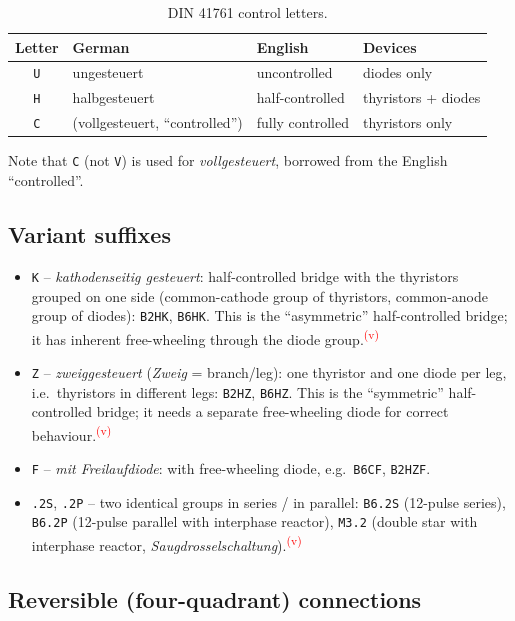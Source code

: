 \documentclass[11pt,a4paper]{article}
\newcommand{\code}[1]{\texttt{#1}}
\newcommand{\verify}{\textsuperscript{\textcolor{red}{(v)}}}
\begin{document}
\begin{table}[htb]
\centering
\caption{DIN 41761 control letters.}
\begin{tabular}{clll}
\toprule
Letter & German & English & Devices \\
\midrule
\code{U} & ungesteuert & uncontrolled & diodes only \\
\code{H} & halbgesteuert & half-controlled & thyristors + diodes \\
\code{C} & (vollgesteuert, ``controlled'') & fully controlled & thyristors only \\
\bottomrule
\end{tabular}
\end{table}

Note that \code{C} (not \code{V}) is used for \emph{vollgesteuert}, borrowed from the English ``controlled''.

\subsection{Variant suffixes}

\begin{itemize}
\item \code{K} -- \emph{kathodenseitig gesteuert}: half-controlled bridge with the thyristors grouped on one side (common-cathode group of thyristors, common-anode group of diodes): \code{B2HK}, \code{B6HK}. This is the ``asymmetric'' half-controlled bridge; it has inherent free-wheeling through the diode group.\verify
\item \code{Z} -- \emph{zweiggesteuert} (\emph{Zweig} = branch/leg): one thyristor and one diode per leg, i.e.\ thyristors in different legs: \code{B2HZ}, \code{B6HZ}. This is the ``symmetric'' half-controlled bridge; it needs a separate free-wheeling diode for correct behaviour.\verify
\item \code{F} -- \emph{mit Freilaufdiode}: with free-wheeling diode, e.g.\ \code{B6CF}, \code{B2HZF}.
\item \code{.2S}, \code{.2P} -- two identical groups in series / in parallel: \code{B6.2S} (12-pulse series), \code{B6.2P} (12-pulse parallel with interphase reactor), \code{M3.2} (double star with interphase reactor, \emph{Saugdrosselschaltung}).\verify
\end{itemize}

\subsection{Reversible (four-quadrant) connections}
\end{document}
